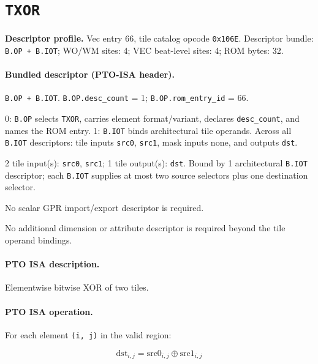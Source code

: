 \section{\texttt{TXOR}}
\noindent\textbf{Descriptor profile.} Vec entry 66, tile catalog opcode \texttt{0x106E}. Descriptor bundle: \texttt{B.OP + B.IOT}; WO/WM sites: 4; VEC beat-level sites: 4; ROM bytes: 32.\par\smallskip
{}
\paragraph{Bundled descriptor (PTO-ISA header).}
\begin{description}[leftmargin=0.18\linewidth,style=nextline]
\item[Bundle] \texttt{B.OP + B.IOT}. \texttt{B.OP.desc\_count} = 1; \texttt{B.OP.rom\_entry\_id} = 66.
\item[Assembly] 0: \texttt{B.OP} selects \texttt{TXOR}, carries element format/variant, declares \texttt{desc\_count}, and names the ROM entry. 1: \texttt{B.IOT} binds architectural tile operands. Across all \texttt{B.IOT} descriptors: tile inputs \texttt{src0}, \texttt{src1}, mask inputs none, and outputs \texttt{dst}.
\item[Tile operands] 2 tile input(s): \texttt{src0}, \texttt{src1}; 1 tile output(s): \texttt{dst}. Bound by 1 architectural \texttt{B.IOT} descriptor; each \texttt{B.IOT} supplies at most two source selectors plus one destination selector.
\item[Scalar GPR operands] No scalar GPR import/export descriptor is required.
\item[Metadata operands] No additional dimension or attribute descriptor is required beyond the tile operand bindings.
\end{description}
\par\smallskip
{\small
\paragraph{PTO ISA description.}
Elementwise bitwise XOR of two tiles.
\paragraph{PTO ISA operation.}
For each element \texttt{(i, j)} in the valid region:

\[
\mathrm{dst}_{i,j} = \mathrm{src0}_{i,j} \oplus \mathrm{src1}_{i,j}
\]
}\par\smallskip

